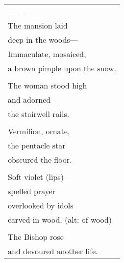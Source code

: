 \documentclass{article}
\begin{document}
\begin{tabular}{l}
\\
--- --- \\
The mansion laid \\
deep in the woods--- \\
Immaculate, mosaiced, \\
a brown pimple upon the snow. \\
\\
The woman stood high \\
and adorned \\
the stairwell rails. \\
\\
Vermilion, ornate, \\
the pentacle star \\
obscured the floor. \\
\\
Soft violet (lips) \\
spelled prayer \\
overlooked by idols \\
carved in wood. (alt: of wood) \\
\\
The Bishop rose \\
and devoured another life. \\
\end{tabular} \\
\end{document}
